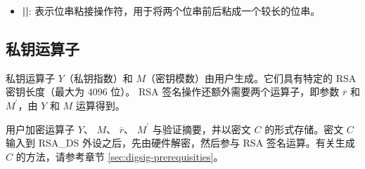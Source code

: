 \documentclass[main\_\_CN.tex]{subfiles}
\begin{document}
\begin{itemize}
    \item {\bfseries ||}:
       表示位串粘接操作符，用于将两个位串前后粘成一个较长的位串。
\end{itemize}



\subsection{私钥运算子}
\label{sec:digsig-private-key-operands}

私钥运算子 \begin{math}Y\end{math}（私钥指数）和 \begin{math}M\end{math}（密钥模数）由用户生成。它们具有特定的 RSA 密钥长度（最大为 4096 位）。
RSA 签名操作还额外需要两个运算子，即参数 \begin{math}\overline{r}\end{math} 和 \begin{math}M^{\prime}\end{math}，由 \begin{math}Y\end{math} 和 \begin{math}M\end{math} 运算得到。


用户加密运算子 \begin{math}Y\end{math}、
\begin{math}M\end{math}、
\begin{math}\overline{r}\end{math}、
\begin{math}M^{\prime}\end{math} 与验证摘要，并以密文 \begin{math}C\end{math} 的形式存储。密文 \begin{math}C\end{math} 输入到 RSA\_DS 外设之后，先由硬件解密，然后参与 RSA 签名运算。有关生成 \begin{math}C\end{math} 的方法，请参考章节 \ref{sec:digsig-prerequisities}。
\end{document}
